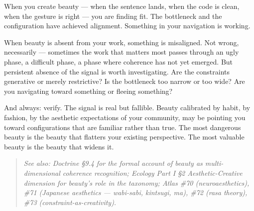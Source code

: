 When you create beauty — when the sentence lands, when the code is clean, when the gesture is right — you are finding fit. The bottleneck and the configuration have achieved alignment. Something in your navigation is working.


When beauty is absent from your work, something is misaligned. Not wrong, necessarily — sometimes the work that matters most passes through an ugly phase, a difficult phase, a phase where coherence has not yet emerged. But persistent absence of the signal is worth investigating. Are the constraints generative or merely restrictive? Is the bottleneck too narrow or too wide? Are you navigating toward something or fleeing something?


And always: verify. The signal is real but fallible. Beauty calibrated by habit, by fashion, by the aesthetic expectations of your community, may be pointing you toward configurations that are familiar rather than true. The most dangerous beauty is the beauty that flatters your existing perspective. The most valuable beauty is the beauty that widens it.


\begin{quote}
\itshape
\textit{See also: Doctrine §9.4 for the formal account of beauty as multi-dimensional coherence recognition; Ecology Part I §2 Aesthetic-Creative dimension for beauty's role in the taxonomy; Atlas \#70 (neuroaesthetics), \#71 (Japanese aesthetics — wabi-sabi, kintsugi, ma), \#72 (rasa theory), \#73 (constraint-as-creativity).}
\end{quote}


\bigskip\noindent\makebox[\textwidth]{\color{rulegray}\rule{5cm}{0.3pt}}\bigskip
